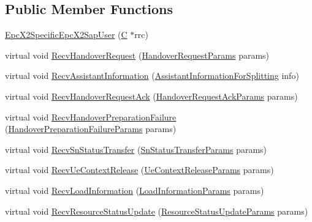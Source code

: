 \subsection*{Public Member Functions}
\begin{DoxyCompactItemize}
\item 
\hyperlink{classns3_1_1EpcX2SpecificEpcX2SapUser_a21fd981f24bd7756234e1901fe0017b3}{Epc\+X2\+Specific\+Epc\+X2\+Sap\+User} (\hyperlink{loss__COST231__small__cities__urban_8m_aaa53ca0b650dfd85c4f59fa156f7a2cc}{C} $\ast$rrc)
\item 
virtual void \hyperlink{classns3_1_1EpcX2SpecificEpcX2SapUser_a62e6c882edb284039fcdd541a6da2ad1}{Recv\+Handover\+Request} (\hyperlink{structns3_1_1EpcX2Sap_1_1HandoverRequestParams}{Handover\+Request\+Params} params)
\item 
virtual void \hyperlink{classns3_1_1EpcX2SpecificEpcX2SapUser_aa36e296ed81ea2787f4713552de49a85}{Recv\+Assistant\+Information} (\hyperlink{structns3_1_1EpcX2Sap_1_1AssistantInformationForSplitting}{Assistant\+Information\+For\+Splitting} info)
\item 
virtual void \hyperlink{classns3_1_1EpcX2SpecificEpcX2SapUser_a902a5f7258a272418aefbe8c78ccfac6}{Recv\+Handover\+Request\+Ack} (\hyperlink{structns3_1_1EpcX2Sap_1_1HandoverRequestAckParams}{Handover\+Request\+Ack\+Params} params)
\item 
virtual void \hyperlink{classns3_1_1EpcX2SpecificEpcX2SapUser_a9b49075a1385ac8671bac106e4c24aac}{Recv\+Handover\+Preparation\+Failure} (\hyperlink{structns3_1_1EpcX2Sap_1_1HandoverPreparationFailureParams}{Handover\+Preparation\+Failure\+Params} params)
\item 
virtual void \hyperlink{classns3_1_1EpcX2SpecificEpcX2SapUser_a09a892fd0f9c8b728923172e3dcb610d}{Recv\+Sn\+Status\+Transfer} (\hyperlink{structns3_1_1EpcX2Sap_1_1SnStatusTransferParams}{Sn\+Status\+Transfer\+Params} params)
\item 
virtual void \hyperlink{classns3_1_1EpcX2SpecificEpcX2SapUser_a29328115f1bbf1b39540cedf6f6dbc9b}{Recv\+Ue\+Context\+Release} (\hyperlink{structns3_1_1EpcX2Sap_1_1UeContextReleaseParams}{Ue\+Context\+Release\+Params} params)
\item 
virtual void \hyperlink{classns3_1_1EpcX2SpecificEpcX2SapUser_a868e1e31d8e44f13a10d86bf574f1311}{Recv\+Load\+Information} (\hyperlink{structns3_1_1EpcX2Sap_1_1LoadInformationParams}{Load\+Information\+Params} params)
\item 
virtual void \hyperlink{classns3_1_1EpcX2SpecificEpcX2SapUser_a06414de3e307e9e93255e375624471ce}{Recv\+Resource\+Status\+Update} (\hyperlink{structns3_1_1EpcX2Sap_1_1ResourceStatusUpdateParams}{Resource\+Status\+Update\+Params} params)

\end{DoxyCompactItemize}
